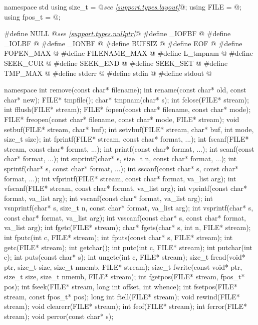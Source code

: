 \begin{codeblock}
namespace std {
  using size_t = @\textit{see \ref{support.types.layout}}@;
  using FILE = @\seebelow@;
  using fpos_t = @\seebelow@;
}

#define NULL @\textit{see \ref{support.types.nullptr}}@
#define _IOFBF @\seebelow@
#define _IOLBF @\seebelow@
#define _IONBF @\seebelow@
#define BUFSIZ @\seebelow@
#define EOF @\seebelow@
#define FOPEN_MAX @\seebelow@
#define FILENAME_MAX @\seebelow@
#define L_tmpnam @\seebelow@
#define SEEK_CUR @\seebelow@
#define SEEK_END @\seebelow@
#define SEEK_SET @\seebelow@
#define TMP_MAX @\seebelow@
#define stderr @\seebelow@
#define stdin @\seebelow@
#define stdout @\seebelow@

namespace {
  int remove(const char* filename);
  int rename(const char* old, const char* new);
  FILE* tmpfile();
  char* tmpnam(char* s);
  int fclose(FILE* stream);
  int fflush(FILE* stream);
  FILE* fopen(const char* filename, const char* mode);
  FILE* freopen(const char* filename, const char* mode, FILE* stream);
  void setbuf(FILE* stream, char* buf);
  int setvbuf(FILE* stream, char* buf, int mode, size_t size);
  int fprintf(FILE* stream, const char* format, ...);
  int fscanf(FILE* stream, const char* format, ...);
  int printf(const char* format, ...);
  int scanf(const char* format, ...);
  int snprintf(char* s, size_t n, const char* format, ...);
  int sprintf(char* s, const char* format, ...);
  int sscanf(const char* s, const char* format, ...);
  int vfprintf(FILE* stream, const char* format, va_list arg);
  int vfscanf(FILE* stream, const char* format, va_list arg);
  int vprintf(const char* format, va_list arg);
  int vscanf(const char* format, va_list arg);
  int vsnprintf(char* s, size_t n, const char* format, va_list arg);
  int vsprintf(char* s, const char* format, va_list arg);
  int vsscanf(const char* s, const char* format, va_list arg);
  int fgetc(FILE* stream);
  char* fgets(char* s, int n, FILE* stream);
  int fputc(int c, FILE* stream);
  int fputs(const char* s, FILE* stream);
  int getc(FILE* stream);
  int getchar();
  int putc(int c, FILE* stream);
  int putchar(int c);
  int puts(const char* s);
  int ungetc(int c, FILE* stream);
  size_t fread(void* ptr, size_t size, size_t nmemb, FILE* stream);
  size_t fwrite(const void* ptr, size_t size, size_t nmemb, FILE* stream);
  int fgetpos(FILE* stream, fpos_t* pos);
  int fseek(FILE* stream, long int offset, int whence);
  int fsetpos(FILE* stream, const fpos_t* pos);
  long int ftell(FILE* stream);
  void rewind(FILE* stream);
  void clearerr(FILE* stream);
  int feof(FILE* stream);
  int ferror(FILE* stream);
  void perror(const char* s);
}
\end{codeblock}


